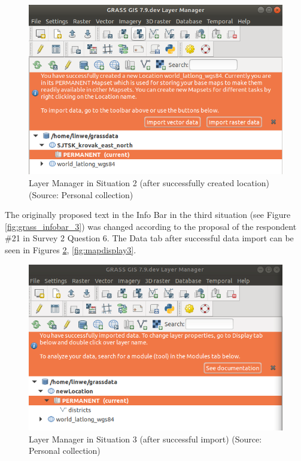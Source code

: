 \documentclass[a4paper,10pt,twoside]{article}
\begin{document}
\begin{figure}[hbt!] 
\begin{center}
\includegraphics[width=13cm]{../pictures/lmgr2.png} 
\caption[Layer Manager in Situation 2 (after successfully created
  location)]{Layer Manager in Situation 2 (after successfully created
  location) (Source: Personal collection)}
\label{fig:lmgr2}
\end{center}
\end{figure}

\noindent The originally proposed text in the Info Bar in the third
situation (see Figure \ref{fig:grass_infobar_3}) was changed according
to the proposal of the respondent \#21 in Survey 2 Question 6. The
Data tab after successful data import can be seen in Figures
\ref{fig:lmgr3}, \ref{fig:mapdisplay3}.

\vspace{0.3cm}
\begin{figure}[hbt!] 
\begin{center}
\includegraphics[width=13cm]{../pictures/lmgr3.png} 
\caption[Layer Manager in Situation 3 (after successful import)]{Layer
  Manager in Situation 3 (after successful import) (Source: Personal
  collection)}
\label{fig:lmgr3}
\end{center}
\end{figure}
\end{document}
